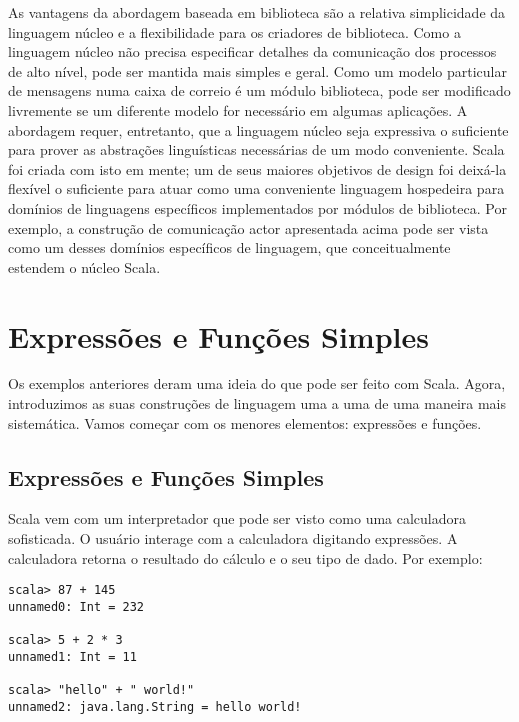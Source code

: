 As vantagens da abordagem baseada em biblioteca s\~{a}o a relativa simplicidade
da linguagem n\'{u}cleo e a flexibilidade para os criadores de biblioteca. Como 
a linguagem n\'{u}cleo n\~{a}o precisa especificar detalhes da comunica\c{c}\~{a}o dos 
processos de alto n\'{i}vel, pode ser mantida mais simples e geral. Como
um modelo particular de mensagens numa caixa de correio \'{e} um m\'{o}dulo biblioteca, 
pode ser modificado livremente se um diferente modelo for necess\'{a}rio em algumas 
aplica\c{c}\~{o}es. A abordagem requer, entretanto, que a linguagem n\'{u}cleo seja expressiva
o suficiente para prover as abstra\c{c}\~{o}es lingu\'{i}sticas necess\'{a}rias de um modo 
conveniente. Scala foi criada com isto em mente; um de seus maiores objetivos de 
design foi deix\'{a}-la flex\'{i}vel o suficiente para atuar como uma conveniente linguagem
hospedeira para dom\'{i}nios de linguagens espec\'{i}ficos implementados por m\'{o}dulos de 
biblioteca. Por exemplo, a constru\c{c}\~{a}o de comunica\c{c}\~{a}o actor apresentada acima
pode ser vista como um desses dom\'{i}nios espec\'{i}ficos de linguagem, que conceitualmente
estendem o n\'{u}cleo Scala.  

\chapter{\label{chap:simple-funs}Express\~{o}es e Fun\c{c}\~{o}es Simples}

Os exemplos anteriores deram uma ideia do que pode ser feito com Scala. Agora,
introduzimos as suas constru\c{c}\~{o}es de linguagem uma a uma de uma maneira mais sistem\'{a}tica.
Vamos come\c{c}ar com os menores elementos: express\~{o}es e fun\c{c}\~{o}es.


\section{Express\~{o}es e Fun\c{c}\~{o}es Simples}


Scala vem com um interpretador que pode ser visto como uma calculadora sofisticada.
O usu\'{a}rio interage com a calculadora digitando express\~{o}es. A calculadora retorna o
resultado do c\'{a}lculo e o seu tipo de dado. Por exemplo: 

\begin{lstlisting}
scala> 87 + 145
unnamed0: Int = 232

scala> 5 + 2 * 3
unnamed1: Int = 11

scala> "hello" + " world!"
unnamed2: java.lang.String = hello world!
\end{lstlisting}

